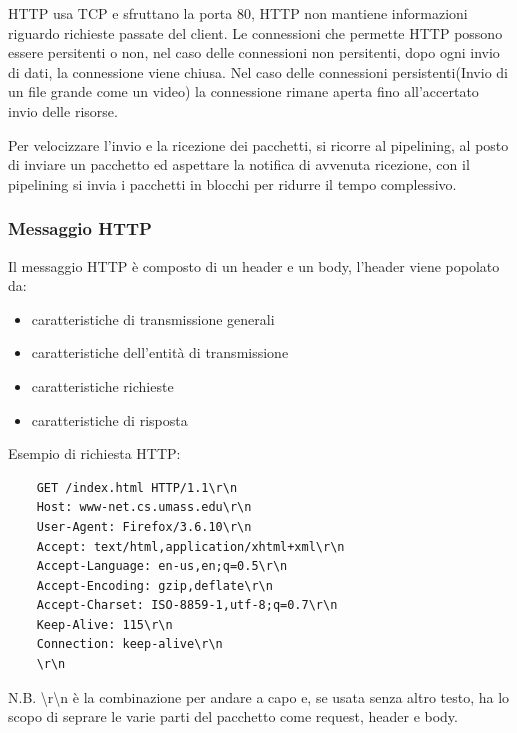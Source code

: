 HTTP usa TCP e sfruttano la porta 80, HTTP non mantiene informazioni riguardo richieste passate del client.
Le connessioni che permette HTTP possono essere persitenti o non, nel caso delle connessioni non persitenti, dopo ogni invio di dati, la connessione viene chiusa.
Nel caso delle connessioni persistenti(Invio di un file grande come un video) la connessione rimane aperta fino all'accertato invio delle risorse.

Per velocizzare l'invio e la ricezione dei pacchetti, si ricorre al pipelining, al posto di inviare un pacchetto ed aspettare la notifica di avvenuta ricezione, con il pipelining si invia i pacchetti in blocchi per ridurre il tempo complessivo.

\subsubsection{Messaggio HTTP}
Il messaggio HTTP è composto di un header e un body, l'header viene popolato da:
\begin{itemize}
    \item caratteristiche di transmissione generali
    \item caratteristiche dell'entità di transmissione
    \item caratteristiche richieste
    \item caratteristiche di risposta
\end{itemize}

Esempio di richiesta HTTP:

\begin{lstlisting}
    GET /index.html HTTP/1.1\r\n
    Host: www-net.cs.umass.edu\r\n
    User-Agent: Firefox/3.6.10\r\n
    Accept: text/html,application/xhtml+xml\r\n
    Accept-Language: en-us,en;q=0.5\r\n
    Accept-Encoding: gzip,deflate\r\n
    Accept-Charset: ISO-8859-1,utf-8;q=0.7\r\n
    Keep-Alive: 115\r\n
    Connection: keep-alive\r\n
    \r\n
\end{lstlisting}

N.B. \textbackslash r\textbackslash n è la combinazione per andare a capo e, se usata senza altro testo, ha lo scopo di seprare le varie parti del pacchetto come request, header e body.


